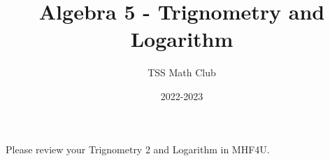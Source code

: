 \documentclass{article}
\title{Algebra 5 - Trignometry and Logarithm }
\author{TSS Math Club}
\date{2022-2023}
\begin{document}
\large

\maketitle

\center

Please review your Trignometry 2 and Logarithm in MHF4U.
\end{document}
